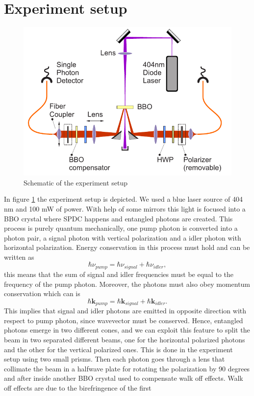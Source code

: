 \documentclass[a4paper,10pt]{article}
\renewcommand{\k}{\mathbf{k}}
\begin{document}
\section{Experiment setup}
\begin{figure}[H]
\centering
\includegraphics[width=\textwidth]{img/setup}
\caption{Schematic of the experiment setup}\label{setup}
\end{figure}
In figure \ref{setup} the experiment setup is depicted. We used a blue laser source of 404 nm and 100 mW of power. With help of some mirrors this light is focused into a BBO crystal where SPDC happens and entangled photons are created. This process is purely quantum mechanically, one pump photon is converted into a photon pair, a signal photon with vertical polarization and a idler photon with horizontal polarization. Energy conservation in this process must hold and can be written as
\[\hbar \nu_{pump} = \hbar \nu_{signal} + \hbar\nu_{idler},\]
this means that the sum of signal and idler frequencies must be equal to the frequency of the pump photon. Moreover, the photons must also obey momentum conservation which can is
\[\hbar \k_{pump} = \hbar \k_{signal} + \hbar\k_{idler}.\]
This implies that signal and idler photons are emitted in opposite direction with respect to pump photon, since wavevector must be conserved. Hence, entangled photons emerge in two different cones, and we can exploit this feature to split the beam in two separated different beams, one for the horizontal polarized photons and the other for the vertical polarized ones. This is done in the experiment setup using two small prisms. Then each photon goes through a lens that collimate the beam in a halfwave plate for rotating the polarization by 90 degrees and after inside another BBO crystal used to compensate walk off effects.  Walk off effects are due to the birefringence of the first
\end{document}
